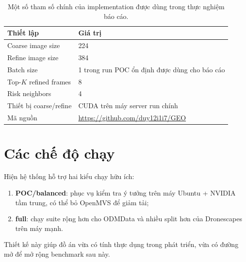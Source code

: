 \documentclass[../DoAn.tex]{subfiles}
\begin{document}
\begin{table}[t]
\centering
\small
\begin{tabular}{lp{8.3cm}}
\toprule
Thiết lập & Giá trị \\
\midrule
Coarse image size & 224 \\
Refine image size & 384 \\
Batch size & 1 trong run POC ổn định được dùng cho báo cáo \\
Top-$K$ refined frames & 8 \\
Risk neighbors & 4 \\
Thiết bị coarse/refine & CUDA trên máy server run chính \\
Mã nguồn & \url{https://github.com/duy12i1i7/GEO} \\
\bottomrule
\end{tabular}
\caption{Một số tham số chính của implementation được dùng trong thực nghiệm báo cáo.}
\label{tab:implementation-thesis}
\end{table}

\section{Các chế độ chạy}

Hiện hệ thống hỗ trợ hai kiểu chạy hữu ích:
\begin{enumerate}[leftmargin=1.5em]
  \item \textbf{POC/balanced}: phục vụ kiểm tra ý tưởng trên máy Ubuntu + NVIDIA tầm trung, có thể bỏ OpenMVS để giảm tải;
  \item \textbf{full}: chạy suite rộng hơn cho ODMData và nhiều split hơn của Dronescapes trên máy mạnh.
\end{enumerate}

Thiết kế này giúp đồ án vừa có tính thực dụng trong phát triển, vừa có đường mở để mở rộng benchmark sau này.
\end{document}
